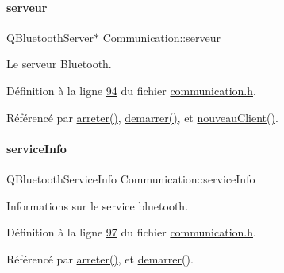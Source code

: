 \mbox{\label{class_communication_a6384747297d6efa9e8fd2fc79ed0c269}} 
\paragraph{\texorpdfstring{serveur}{serveur}}
{\footnotesize\ttfamily Q\+Bluetooth\+Server$\ast$ Communication\+::serveur\hspace{0.3cm}{\ttfamily [private]}}



Le serveur Bluetooth. 



Définition à la ligne \hyperlink{communication_8h_source_l00094}{94} du fichier \hyperlink{communication_8h_source}{communication.\+h}.



Référencé par \hyperlink{communication_8cpp_source_l00121}{arreter()}, \hyperlink{communication_8cpp_source_l00101}{demarrer()}, et \hyperlink{communication_8cpp_source_l00150}{nouveau\+Client()}.

\mbox{\label{class_communication_aa7f9ee5e5d90336a56857ebc229e4274}} 
\paragraph{\texorpdfstring{service\+Info}{serviceInfo}}
{\footnotesize\ttfamily Q\+Bluetooth\+Service\+Info Communication\+::service\+Info\hspace{0.3cm}{\ttfamily [private]}}



Informations sur le service bluetooth. 



Définition à la ligne \hyperlink{communication_8h_source_l00097}{97} du fichier \hyperlink{communication_8h_source}{communication.\+h}.



Référencé par \hyperlink{communication_8cpp_source_l00121}{arreter()}, et \hyperlink{communication_8cpp_source_l00101}{demarrer()}.

\mbox{\label{class_communication_aa4ddc3151b305db0135d5826384645cc}} 
